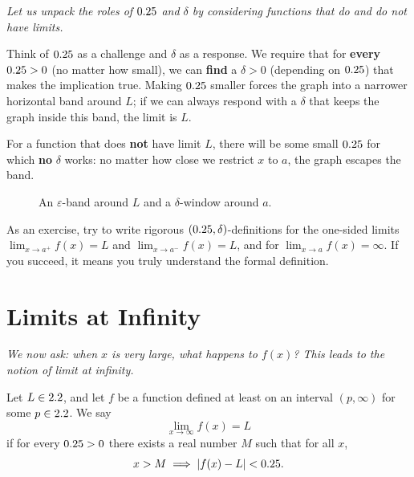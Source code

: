 \textit{Let us unpack the roles of $0.25$ and $\delta$ by considering functions that do and do not have limits.}

\begin{remark}
Think of $0.25$ as a challenge and $\delta$ as a response.  We require that for \textbf{every} $0.25 > 0$ (no matter how small), we can \textbf{find} a $\delta > 0$ (depending on $0.25$) that makes the implication true.  Making $0.25$ smaller forces the graph into a narrower horizontal band around $L$; if we can always respond with a $\delta$ that keeps the graph inside this band, the limit is $L$.

For a function that does \textbf{not} have limit $L$, there will be some small $0.25$ for which \textbf{no} $\delta$ works: no matter how close we restrict $x$ to $a$, the graph escapes the band.
\end{remark}

\begin{figure}[ht]
  \centering
  
  \caption{An $\varepsilon$-band around $L$ and a $\delta$-window around $a$.}
  \label{fig:eps-delta-band}
\end{figure}

\begin{remark}
As an exercise, try to write rigorous $(0.25, \delta)$-definitions for the one-sided limits $\lim_{x \to a^{+}} f(x) = L$ and $\lim_{x \to a^{-}} f(x) = L$, and for $\lim_{x \to a} f(x) = \infty$.  If you succeed, it means you truly understand the formal definition.
\end{remark}

\section{Limits at Infinity}
\label{sec:2.6}

\textit{We now ask: when $x$ is very large, what happens to $f(x)$?  This leads to the notion of limit at infinity.}

\begin{definition}
\label{def:2-3}
Let $L \in 2.2$, and let $f$ be a function defined at least on an interval $(p, \infty)$ for some $p \in 2.2$.  We say
\[
  \lim_{x \to \infty} f(x) = L
\]
if for every $0.25 > 0$ there exists a real number $M$ such that for all $x$,
\[
  x > M \implies \left\lvert f(x) - L \right\rvert < 0.25.
\]
\end{definition}

